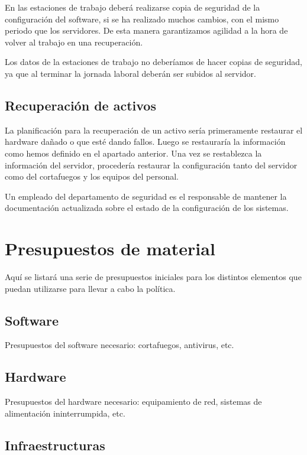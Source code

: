 \documentclass[11pt,bibtotoc,noliststotoc,BCOR0mm]{scrbook}
\begin{document}
En las estaciones de trabajo deberá realizarse copia de seguridad de la configuración del software, si se ha realizado muchos cambios, con el mismo periodo que los servidores. De esta manera garantizamos agilidad a la hora de volver al trabajo en una recuperación.

Los datos de la estaciones de trabajo no deberíamos de hacer copias de seguridad, ya que al terminar la jornada laboral deberán ser subidos al servidor. 

\section{Recuperación de activos}
\label{sec:desastre}

La planificación para la recuperación de un activo sería primeramente restaurar el hardware dañado o que esté dando fallos. Luego se restauraría la información como hemos definido en el apartado anterior. Una vez se restablezca la información del servidor, procedería restaurar la configuración tanto del servidor como del cortafuegos y los equipos del personal.

Un empleado del departamento de seguridad es el responsable de mantener la documentación actualizada sobre el estado de la configuración de los sistemas.


\appendix

\chapter{Presupuestos de material}
Aquí se listará una serie de presupuestos iniciales para los
distintos elementos que puedan utilizarse para llevar a cabo la
política.

\section{Software}

Presupuestos del software necesario: cortafuegos, antivirus, etc.

\section{Hardware}

Presupuestos del hardware necesario: equipamiento de red, sistemas de
alimentación ininterrumpida, etc.

\section{Infraestructuras}
\end{document}
